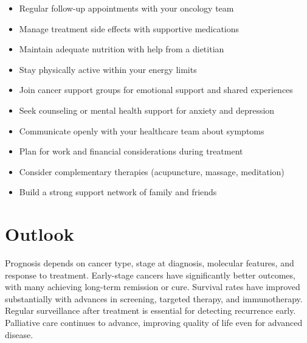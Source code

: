 \begin{itemize}[noitemsep]
  \item Regular follow-up appointments with your oncology team
  \item Manage treatment side effects with supportive medications
  \item Maintain adequate nutrition with help from a dietitian
  \item Stay physically active within your energy limits
  \item Join cancer support groups for emotional support and shared experiences
  \item Seek counseling or mental health support for anxiety and depression
  \item Communicate openly with your healthcare team about symptoms
  \item Plan for work and financial considerations during treatment
  \item Consider complementary therapies (acupuncture, massage, meditation)
  \item Build a strong support network of family and friends
\end{itemize}
\section{Outlook}
Prognosis depends on cancer type, stage at diagnosis, molecular features, and response to treatment. Early-stage cancers have significantly better outcomes, with many achieving long-term remission or cure. Survival rates have improved substantially with advances in screening, targeted therapy, and immunotherapy. Regular surveillance after treatment is essential for detecting recurrence early. Palliative care continues to advance, improving quality of life even for advanced disease.
